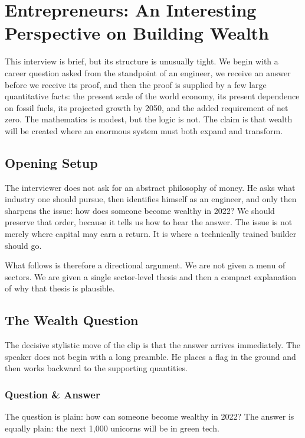 \chapter{Entrepreneurs: An Interesting Perspective on Building Wealth}

This interview is brief, but its structure is unusually tight. We begin with a career question asked from the standpoint of an engineer, we receive an answer before we receive its proof, and then the proof is supplied by a few large quantitative facts: the present scale of the world economy, its present dependence on fossil fuels, its projected growth by 2050, and the added requirement of net zero. The mathematics is modest, but the logic is not. The claim is that wealth will be created where an enormous system must both expand and transform.

\section{Opening Setup}

The interviewer does not ask for an abstract philosophy of money. He asks what industry one should pursue, then identifies himself as an engineer, and only then sharpens the issue: how does someone become wealthy in 2022? We should preserve that order, because it tells us how to hear the answer. The issue is not merely where capital may earn a return. It is where a technically trained builder should go.

What follows is therefore a directional argument. We are not given a menu of sectors. We are given a single sector-level thesis and then a compact explanation of why that thesis is plausible.

\section{The Wealth Question}

The decisive stylistic move of the clip is that the answer arrives immediately. The speaker does not begin with a long preamble. He places a flag in the ground and then works backward to the supporting quantities.

\subsection{Question \& Answer}

The question is plain: how can someone become wealthy in 2022? The answer is equally plain: the next 1{,}000 unicorns will be in green tech.

